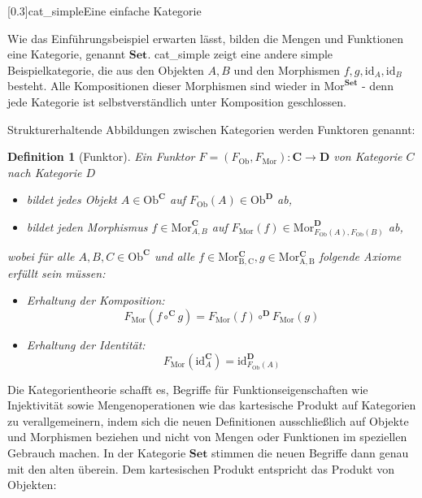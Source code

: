 \documentclass[a4paper, bibgerm]{article}
\newcommand\abb{}
\newcommand\fig{}
\newtheorem{defi}{Definition}
\begin{document}
\fig[0.3]{cat_simple}{Eine einfache Kategorie}

Wie das Einführungsbeispiel erwarten lässt, bilden die Mengen und
Funktionen eine Kategorie, genannt $\mathbf{Set}$. \abb{cat_simple} zeigt eine
andere simple Beispielkategorie, die aus den Objekten $A, B$ und den
Morphismen $f, g, \mathrm{id}_A, \mathrm{id}_B$ besteht. Alle Kompositionen
dieser Morphismen sind wieder in $\mathrm{Mor}^{\mathbf{Set}}$ - denn
jede Kategorie ist selbstverständlich unter Komposition geschlossen.

Strukturerhaltende Abbildungen zwischen Kategorien werden Funktoren genannt:

\begin{defi}[Funktor]
Ein Funktor $F=(F_{\mathrm{Ob}},F_{\mathrm{Mor}}) : \mathbf{C}
\rightarrow \mathbf{D}$ von Kategorie $C$ nach Kategorie $D$  
    \begin{itemize}
    \item bildet jedes Objekt $A \in \mathrm{Ob}^{\mathbf{C}}$ auf $F_{\mathrm{Ob}}(A) \in
      \mathrm{Ob}^{\mathbf{D}}$ ab, 
    \item bildet jeden Morphismus $f \in
      \mathrm{Mor}^{\mathbf{C}}_{A,B}$ auf $F_{\mathrm{Mor}}(f) \in
      \mathrm{Mor}^{\mathbf{D}}_{F_{\mathrm{Ob}}(A),F_{\mathrm{Ob}}(B)}$
      ab,
    \end{itemize}   
    wobei für alle $A,B,C \in \mathrm{Ob}^{\mathbf{C}}$ und alle $f \in
    \mathrm{Mor^{\mathbf{C}}_{B,C}},g \in
    \mathrm{Mor^{\mathbf{C}}_{A,B}}$ folgende Axiome erfüllt sein 
    müssen: 
    \begin{itemize}
    \item Erhaltung der Komposition:
      $$F_{\mathrm{Mor}}(f \circ^{\mathbf{C}} g) =
      F_{\mathrm{Mor}}(f) \circ^{\mathbf{D}} F_{\mathrm{Mor}}(g)$$
    \item Erhaltung der Identität:
      $$F_{\mathrm{Mor}}(\mathrm{id}^{\mathbf{C}}_A) =
      \mathrm{id}^{\mathbf{D}}_{F_{\mathrm{Ob}}(A)}$$
    \end{itemize}
\end{defi}

Die Kategorientheorie schafft es, Begriffe für Funktionseigenschaften
wie Injektivität sowie Mengenoperationen wie das kartesische Produkt auf
Kategorien zu verallgemeinern, indem sich die neuen Definitionen
ausschließlich auf Objekte und Morphismen beziehen und nicht von Mengen
oder Funktionen im speziellen Gebrauch machen. In der Kategorie
$\mathbf{Set}$ stimmen die neuen Begriffe dann genau mit den alten
überein. Dem kartesischen Produkt entspricht das Produkt von Objekten:
\end{document}
